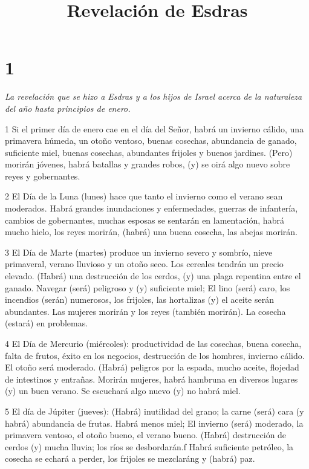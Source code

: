 

\title{Revelación de Esdras}

\chapter{1}

\par \textit{La revelación que se hizo a Esdras y a los hijos de Israel acerca de la naturaleza del año hasta principios de enero.}

\par 1 Si el primer día de enero cae en el día del Señor, habrá un invierno cálido, una primavera húmeda, un otoño ventoso, buenas cosechas, abundancia de ganado, suficiente miel, buenas cosechas, abundantes frijoles y buenos jardines. (Pero) morirán jóvenes, habrá batallas y grandes robos, (y) se oirá algo nuevo sobre reyes y gobernantes.

\par 2 El Día de la Luna (lunes) hace que tanto el invierno como el verano sean moderados. Habrá grandes inundaciones y enfermedades, guerras de infantería, cambios de gobernantes, muchas esposas se sentarán en lamentación, habrá mucho hielo, los reyes morirán, (habrá) una buena cosecha, las abejas morirán.

\par 3 El Día de Marte (martes) produce un invierno severo y sombrío, nieve primaveral, verano lluvioso y un otoño seco. Los cereales tendrán un precio elevado. (Habrá) una destrucción de los cerdos, (y) una plaga repentina entre el ganado. Navegar (será) peligroso y (y) suficiente miel; El lino (será) caro, los incendios (serán) numerosos, los frijoles, las hortalizas (y) el aceite serán abundantes. Las mujeres morirán y los reyes (también morirán). La cosecha (estará) en problemas.

\par 4 El Día de Mercurio (miércoles): productividad de las cosechas, buena cosecha, falta de frutos, éxito en los negocios, destrucción de los hombres, invierno cálido. El otoño será moderado. (Habrá) peligros por la espada, mucho aceite, flojedad de intestinos y entrañas. Morirán mujeres, habrá hambruna en diversos lugares (y) un buen verano. Se escuchará algo nuevo (y) no habrá miel.

\par 5 El día de Júpiter (jueves): (Habrá) inutilidad del grano; la carne (será) cara (y habrá) abundancia de frutas. Habrá menos miel; El invierno (será) moderado, la primavera ventoso, el otoño bueno, el verano bueno. (Habrá) destrucción de cerdos (y) mucha lluvia; los ríos se desbordarán.f Habrá suficiente petróleo, la cosecha se echará a perder, los frijoles se mezclaráng y (habrá) paz.

